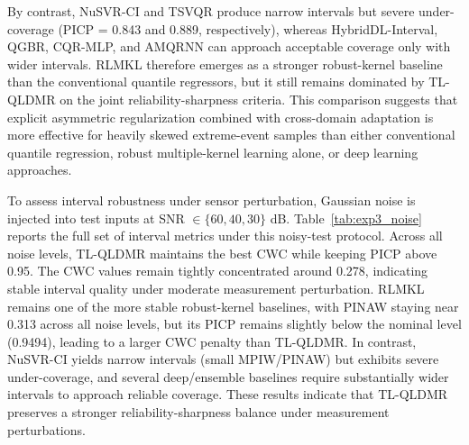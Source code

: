 By contrast, NuSVR-CI and TSVQR produce narrow intervals but severe under-coverage (PICP = 0.843 and 0.889, respectively), whereas HybridDL-Interval, QGBR, CQR-MLP, and AMQRNN can approach acceptable coverage only with wider intervals. RLMKL therefore emerges as a stronger robust-kernel baseline than the conventional quantile regressors, but it still remains dominated by TL-QLDMR on the joint reliability-sharpness criteria. This comparison suggests that explicit asymmetric regularization combined with cross-domain adaptation is more effective for heavily skewed extreme-event samples than either conventional quantile regression, robust multiple-kernel learning alone, or deep learning approaches.

To assess interval robustness under sensor perturbation, Gaussian noise is injected into test inputs at SNR $\in \{60,40,30\}$ dB.
Table~\ref{tab:exp3_noise} reports the full set of interval metrics under this noisy-test protocol.
Across all noise levels, TL-QLDMR maintains the best CWC while keeping PICP above 0.95. The CWC values remain tightly concentrated around 0.278, indicating stable interval quality under moderate measurement perturbation. RLMKL remains one of the more stable robust-kernel baselines, with PINAW staying near 0.313 across all noise levels, but its PICP remains slightly below the nominal level (0.9494), leading to a larger CWC penalty than TL-QLDMR. In contrast, NuSVR-CI yields narrow intervals (small MPIW/PINAW) but exhibits severe under-coverage, and several deep/ensemble baselines require substantially wider intervals to approach reliable coverage. These results indicate that TL-QLDMR preserves a stronger reliability-sharpness balance under measurement perturbations.
\FloatBarrier

